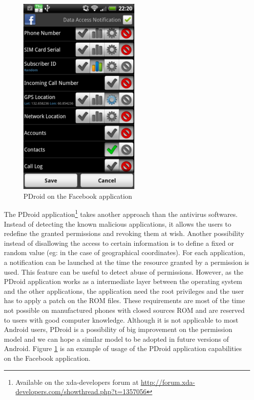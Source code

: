 \begin{figure}[h]
  \centering
  \includegraphics[width=6cm]{images/pdroid.png}
  \caption{PDroid on the Facebook application}
  \label{fig:pdroid}
\end{figure}


The PDroid application\footnote{Available on the xda-developers forum at \url{http://forum.xda-developers.com/showthread.php?t=1357056}} takes another approach than the antivirus softwares.
Instead of detecting the known malicious applications, it allows the users to redefine the granted permissions and revoking them at wish.
Another possibility instead of disallowing the access to certain information is to define a fixed or random value (eg: in the case of geographical coordinates).
For each application, a notification can be launched at the time the resource granted by a permission is used.
This feature can be useful to detect abuse of permissions.
However, as the PDroid application works as a intermediate layer between the operating system and the other applications, the application need the root privileges and the user has to apply a patch on the ROM files.
These requirements are most of the time not possible on manufactured phones with closed sources ROM and are reserved to users with good computer knowledge.
Although it is not applicable to most Android users, PDroid is a possibility of big improvement on the permission model and we can hope a similar model to be adopted in future versions of Android.
Figure \ref{fig:pdroid} is an example of usage of the PDroid application capabilities on the Facebook application.
